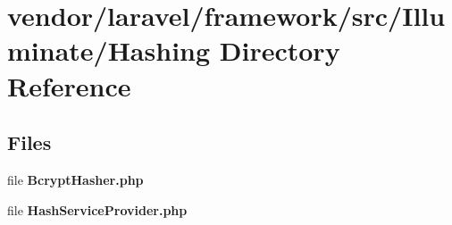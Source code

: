 \section{vendor/laravel/framework/src/\+Illuminate/\+Hashing Directory Reference}
\label{dir_b0f764e0171cde3a51a8db3c67ad7ee9}
\subsection*{Files}
\begin{DoxyCompactItemize}
\item 
file {\bf Bcrypt\+Hasher.\+php}
\item 
file {\bf Hash\+Service\+Provider.\+php}
\end{DoxyCompactItemize}
